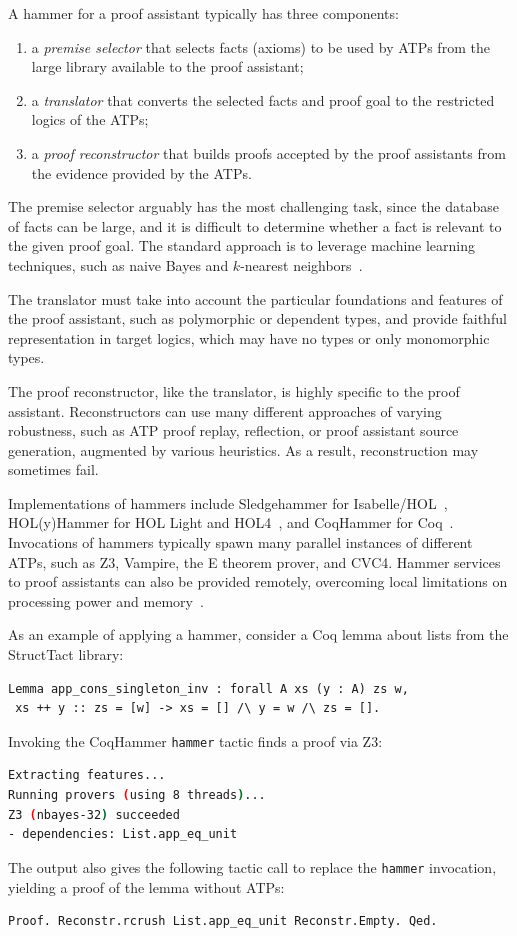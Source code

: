 A hammer for a proof assistant typically has three components:
\begin{enumerate}
\item a \emph{premise selector} that selects facts (axioms) to be used by ATPs from the large library available to the proof assistant;
\item a \emph{translator} that converts the selected facts and proof goal to the restricted logics of the ATPs;
\item a \emph{proof reconstructor} that builds proofs accepted by the proof assistants from the evidence provided by the ATPs.
\end{enumerate}

The premise selector arguably has the most challenging task, since the database of facts can be large, and it is difficult to determine whether a fact is relevant to the given proof goal. The standard approach is to leverage machine learning techniques, such as naive Bayes and $k$-nearest neighbors~\citep{Blanchette2016,Czajka2018}.

The translator must take into account the particular foundations and features of the proof assistant, such as polymorphic or dependent types, and provide faithful representation in target logics, which may have no types or only monomorphic types.

The proof reconstructor, like the translator, is highly specific to the proof assistant. Reconstructors can use many different approaches of varying robustness, such as ATP proof replay, reflection, or proof assistant source generation, augmented by various heuristics. As a result, reconstruction may sometimes fail.

Implementations of hammers include Sledgehammer for Isabelle/HOL~\citep{Blanchette2013}, HOL(y)Hammer for HOL Light and HOL4~\citep{Kaliszyk2014}, and CoqHammer for Coq~\citep{Czajka2018,coqhammer}. Invocations of hammers typically spawn many parallel instances of different ATPs, such as Z3, Vampire, the E theorem prover, and CVC4. Hammer services to proof assistants can also be provided remotely, overcoming local limitations on processing power and memory~\citep{Kaliszyk2015}.

As an example of applying a hammer, consider a Coq lemma about lists from the StructTact library:
\begin{lstlisting}
Lemma app_cons_singleton_inv : forall A xs (y : A) zs w,
 xs ++ y :: zs = [w] -> xs = [] /\ y = w /\ zs = [].
\end{lstlisting}
Invoking the CoqHammer \lstinline{hammer} tactic finds a proof via Z3:
\begin{lstlisting}[language=sh]
Extracting features...
Running provers (using 8 threads)...
Z3 (nbayes-32) succeeded
- dependencies: List.app_eq_unit
\end{lstlisting}
The output also gives the following tactic call to replace the \lstinline{hammer} invocation, yielding a proof of the lemma without ATPs: 
\begin{lstlisting}
Proof. Reconstr.rcrush List.app_eq_unit Reconstr.Empty. Qed.
\end{lstlisting}

